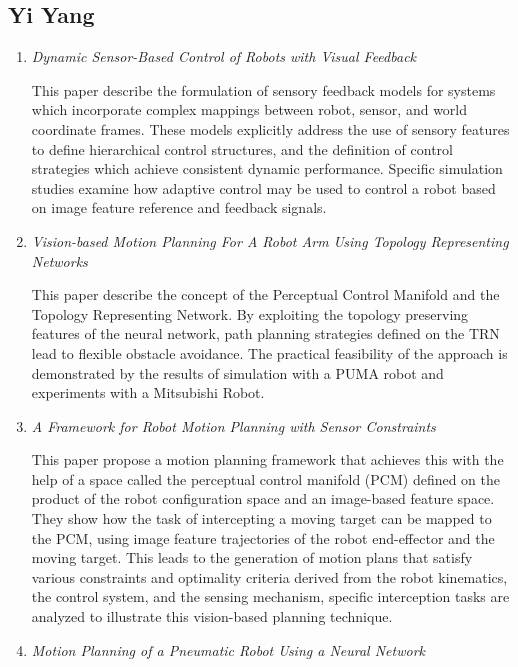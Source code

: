 \documentclass[10pt,twocolumn,letterpaper]{article}
\begin{document}
\subsection{Yi Yang}

\begin{enumerate}
\item \textit{Dynamic Sensor-Based Control of Robots with Visual Feedback} \cite{1087115}

This paper describe the formulation of sensory feedback models for systems which incorporate complex mappings between robot, sensor, and world coordinate frames. These models explicitly address the use of sensory features to define hierarchical control structures, and the definition of control strategies which achieve consistent dynamic performance. Specific simulation studies examine how adaptive control may be used to control a robot based on image feature reference and feedback signals. 

\item \textit{Vision-based Motion Planning For A Robot Arm Using Topology Representing Networks} \cite{844872}

This paper describe the concept of the Perceptual Control Manifold and the Topology Representing Network. By exploiting the topology preserving features of the neural network, path planning strategies defined on the TRN lead to flexible obstacle avoidance. The practical feasibility of the approach is demonstrated by the results of simulation with a PUMA robot and experiments with a Mitsubishi Robot. 

\item \textit{A Framework for Robot Motion Planning with Sensor Constraints} \cite{554347}

This paper propose a motion planning framework that achieves this with the help of a space called the perceptual control manifold (PCM) defined on the product of the robot configuration space and an image-based feature space. They show how the task of intercepting a moving target can be mapped to the PCM, using image feature trajectories of the robot end-effector and the moving target. This leads to the generation of motion plans that satisfy various constraints and optimality criteria derived from the robot kinematics, the control system, and the sensing mechanism, specific interception tasks are analyzed to illustrate this vision-based planning technique. 

\item \textit{Motion Planning of a Pneumatic Robot Using a Neural Network} \cite{588194}


\end{enumerate}
\end{document}
